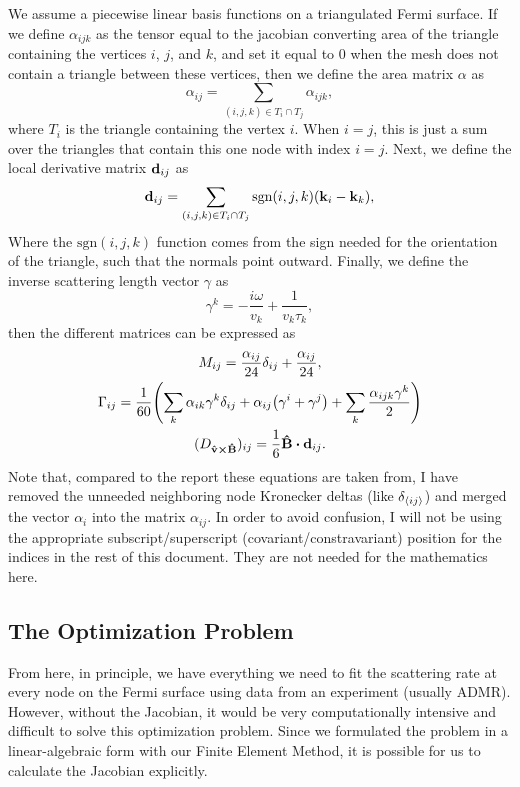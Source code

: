 \documentclass[12pt]{article}
\begin{document}
We assume a piecewise linear basis functions on a triangulated Fermi surface.
If we define $\alpha_{ijk}$ as the tensor equal to the jacobian converting area of the triangle containing the vertices $i$, $j$, and $k$,
and set it equal to 0 when the mesh does not contain a triangle between these vertices,
then we define the area matrix $\alpha$ as
\begin{equation}
    \alpha_{ij} = \sum_{(i,j,k) \in T_i \cap T_j} \alpha_{ijk},
\end{equation}
where $T_i$ is the triangle containing the vertex $i$.
When $i=j$, this is just a sum over the triangles that contain this one node with index $i=j$.
Next, we define the local derivative matrix $\vb{d}_{ij}$ as
\begin{equation}
    \vb{d}_{ij} = \sum_{(i,j,k) \in T_i \cap T_j} \text{sgn}(i,j,k)(\vb{k}_i - \vb{k}_k),
\end{equation}
Where the $\text{sgn}(i,j,k)$ function comes from the sign needed for the orientation of the triangle,
such that the normals point outward.
Finally, we define the inverse scattering length vector $\gamma$ as
\begin{equation}
    \gamma^k = -\frac{i\omega}{v_k} + \frac{1}{v_k\tau_k},
\end{equation}
then the different matrices can be expressed as
\begin{gather}
    M_{ij} = \frac{\alpha_{ij}}{24}\delta_{ij} + \frac{\alpha_{ij}}{24}, \\
    \Gamma_{ij} = \frac{1}{60}\qty(
        \sum_k\alpha_{ik}\gamma^k\delta_{ij}
        + \alpha_{ij}\qty(\gamma^i+\gamma^j) + \sum_k\frac{\alpha_{ijk}\gamma^k}{2}) \\
    (D_{\vu{v}\cross\vu{B}})_{ij} = \frac{1}{6}\vu{B}\vdot\vb{d}_{ij}.
\end{gather}
Note that, compared to the report these equations are taken from, I have removed the unneeded neighboring node Kronecker deltas (like $\delta_{\expval{ij}}$)
and merged the vector $\alpha_i$ into the matrix $\alpha_{ij}$.
In order to avoid confusion, I will not be using the appropriate subscript/superscript (covariant/constravariant) position for the indices in the rest of this document.
They are not needed for the mathematics here.

\subsection{The Optimization Problem}
From here, in principle, we have everything we need to fit the scattering rate at every node on the Fermi surface using data from an experiment (usually ADMR). However, without the Jacobian, it would be very computationally intensive and difficult to solve this optimization problem. Since we formulated the problem in a linear-algebraic form with our Finite Element Method, it is possible for us to calculate the Jacobian explicitly.
\end{document}
